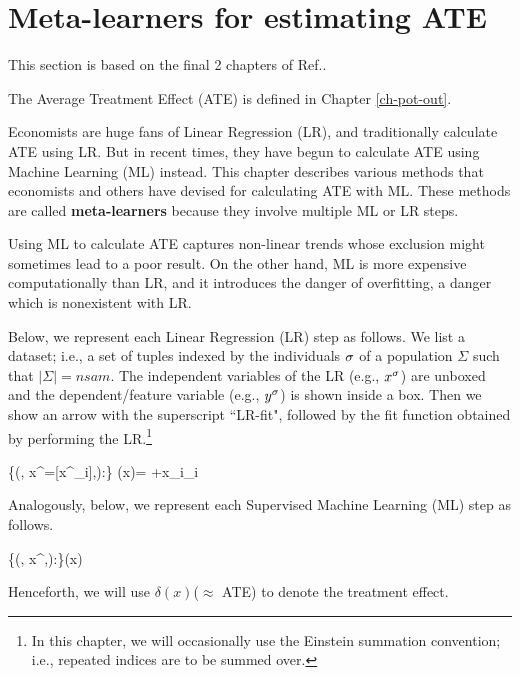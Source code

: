 \chapter{Meta-learners
for estimating ATE}
\label{ch-meta-learners}


This section
is based on the final 2 chapters of
Ref.\cite{alves-book}.

The Average Treatment Effect (ATE)
is defined in Chapter \ref{ch-pot-out}.

Economists are huge fans of Linear Regression (LR),
and traditionally calculate  ATE using LR.
But in recent times,
they have begun to
calculate ATE using Machine Learning
(ML) instead. 
This chapter describes various methods
that economists and others have devised
for calculating ATE with ML.
These methods
are called {\bf meta-learners}
because they involve multiple
ML or LR steps.

Using ML
to calculate
ATE
captures non-linear trends
whose exclusion might sometimes lead to a poor result. 
On the other hand,
ML is more expensive computationally
than LR, 
and it introduces
the danger of overfitting, a danger
which is nonexistent with LR.




Below,
we represent each
Linear Regression (LR) step
as follows. 
We list a dataset; i.e., a 
set of tuples indexed by
the individuals $\sigma$
of a population $\Sigma$
such that $|\Sigma|=nsam$.
The independent variables 
of the LR (e.g., $x^\sigma$)
are unboxed and the
 dependent/feature 
variable (e.g., $y^\sigma$)
is shown inside a box.
Then we show an arrow with the
superscript ``LR-fit",
followed by the fit function
obtained by performing the LR.\footnote{
In this chapter,
we will occasionally
use the Einstein summation convention;
i.e.,
repeated indices are to be summed over.}



\beq
\{(\s, x^\s =[x^\s_i],):\s\in \Sigma\}
\lrarr
 \haty(x)=
\alp +x_i\beta_i
\eeq


Analogously, below,
we represent each
Supervised Machine
 Learning (ML) step as follows.


\beq
\{(\s, x^\s,):\s\in \Sigma\}\mlarr \haty(x)
\label{eq-gen-ml}
\eeq


Henceforth, we will use $\delta(x)$($\approx$ ATE) to
denote the treatment effect.



